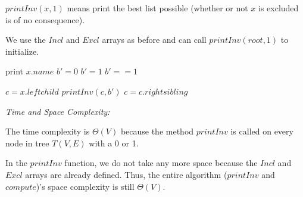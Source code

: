 \documentclass[a4paper]{report}
\begin{document}
\begin{enumerate}
      $printInv(x, 1)$ means print the best list possible (whether or not $x$ is excluded is of no consequence).

      We use the $Incl$ and $Excl$ arrays as before and can call $printInv(root, 1)$ to initialize. 

      \begin{algorithmic}[1]
              \State print $x.name$
              \State $b' = 0$
            \Else
              \State $b' = 1$
            \EndIf
          \Else
            \State $b' == 1$
          \EndIf

          \State $c = x.leftchild$
            \State $printInv(c, b')$
            \State $c = c.rightsibling$
          \EndWhile
        \EndFunction
      \end{algorithmic}

      {\it Time and Space Complexity:}

      The time complexity is $\Theta(V)$ because the method $printInv$ is called on every node in tree $T(V,E)$ with a 0 or 1.

      In the $printInv$ function, we do not take any more space because the $Incl$ and $Excl$ arrays are already defined. 
      Thus, the entire algorithm ($printInv$ and $compute$)'s space complexity is still $\Theta(V)$.


  \end{enumerate}

  
















































  
\end{document}
